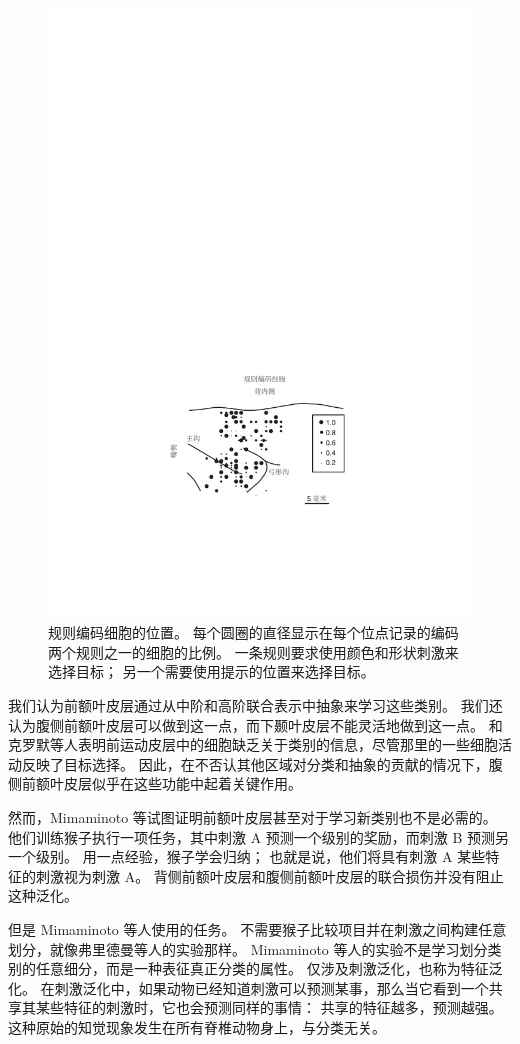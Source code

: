 \begin{figure}
	\centering
	\includegraphics[width=0.6\linewidth]{chap7/7_8}
	\caption{规则编码细胞的位置。
		每个圆圈的直径显示在每个位点记录的编码两个规则之一的细胞的比例。
		一条规则要求使用颜色和形状刺激来选择目标； 另一个需要使用提示的位置来选择目标\cite{white1999rule}。 \label{fig:7_8}}
\end{figure}
\par


我们认为前额叶皮层通过从中阶和高阶联合表示中抽象来学习这些类别。 
我们还认为腹侧前额叶皮层可以做到这一点，而下颞叶皮层不能灵活地做到这一点。
和克罗默等人\cite{cromer2011comparison}表明前运动皮层中的细胞缺乏关于类别的信息，尽管那里的一些细胞活动反映了目标选择。 
因此，在不否认其他区域对分类和抽象的贡献的情况下，腹侧前额叶皮层似乎在这些功能中起着关键作用。
\par


然而，Mimaminoto 等\cite{monti2010willful}试图证明前额叶皮层甚至对于学习新类别也不是必需的。
他们训练猴子执行一项任务，其中刺激 A 预测一个级别的奖励，而刺激 B 预测另一个级别。 
用一点经验，猴子学会归纳；
也就是说，他们将具有刺激 A 某些特征的刺激视为刺激 A。
背侧前额叶皮层和腹侧前额叶皮层的联合损伤并没有阻止这种泛化。
\par


但是 Mimaminoto 等人使用的任务。
不需要猴子比较项目并在刺激之间构建任意划分，就像弗里德曼等人的实验那样。
Mimaminoto 等人的实验不是学习划分类别的任意细分，而是一种表征真正分类的属性。 
仅涉及刺激泛化，也称为特征泛化\cite{buckley2010top}。 
在刺激泛化中，如果动物已经知道刺激可以预测某事，那么当它看到一个共享其某些特征的刺激时，它也会预测同样的事情：
共享的特征越多，预测越强。
这种原始的知觉现象发生在所有脊椎动物身上，与分类无关。
\par


